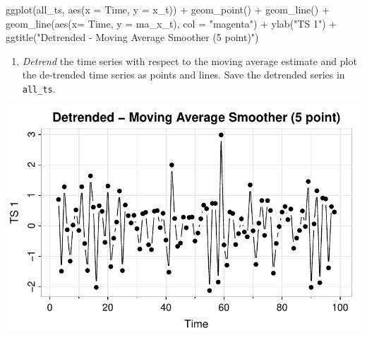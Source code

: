 \documentclass[
  letterpaper,
  DIV=11,
  numbers=noendperiod]{scrartcl}
\newenvironment{Shaded}{\begin{snugshade}}{\end{snugshade}}
\newcommand{\AttributeTok}[1]{\textcolor[rgb]{0.40,0.45,0.13}{#1}}
\newcommand{\DecValTok}[1]{\textcolor[rgb]{0.68,0.00,0.00}{#1}}
\newcommand{\FunctionTok}[1]{\textcolor[rgb]{0.28,0.35,0.67}{#1}}
\newcommand{\NormalTok}[1]{\textcolor[rgb]{0.00,0.23,0.31}{#1}}
\newcommand{\OtherTok}[1]{\textcolor[rgb]{0.00,0.23,0.31}{#1}}
\newcommand{\SpecialCharTok}[1]{\textcolor[rgb]{0.37,0.37,0.37}{#1}}
\newcommand{\StringTok}[1]{\textcolor[rgb]{0.13,0.47,0.30}{#1}}
\providecommand{\tightlist}{%
  \setlength{\itemsep}{0pt}\setlength{\parskip}{0pt}}\usepackage{longtable,booktabs,array}
\begin{document}
\begin{Shaded}
\begin{Highlighting}[]
\FunctionTok{ggplot}\NormalTok{(all\_ts, }\FunctionTok{aes}\NormalTok{(}\AttributeTok{x =}\NormalTok{ Time, }\AttributeTok{y =}\NormalTok{ x\_t)) }\SpecialCharTok{+} \FunctionTok{geom\_point}\NormalTok{() }\SpecialCharTok{+} \FunctionTok{geom\_line}\NormalTok{() }\SpecialCharTok{+} 
  \FunctionTok{geom\_line}\NormalTok{(}\FunctionTok{aes}\NormalTok{(}\AttributeTok{x=}\NormalTok{ Time, }\AttributeTok{y =}\NormalTok{ ma\_x\_t), }\AttributeTok{col =} \StringTok{"magenta"}\NormalTok{) }\SpecialCharTok{+}
  \FunctionTok{ylab}\NormalTok{(}\StringTok{"TS 1"}\NormalTok{) }\SpecialCharTok{+} \FunctionTok{ggtitle}\NormalTok{(}\StringTok{"Detrended {-} Moving Average Smoother (5 point)"}\NormalTok{)}
\end{Highlighting}
\end{Shaded}

\begin{enumerate}
\def\labelenumi{\arabic{enumi}.}
\setcounter{enumi}{3}
\tightlist
\item
  \emph{Detrend} the time series with respect to the moving average
  estimate and plot the de-trended time series as points and lines. Save
  the detrended series in \texttt{all\_ts}.
\end{enumerate}

\begin{Shaded}
\end{Shaded}

\includegraphics{Lecture7_files/figure-pdf/astsa_act2_p4-1.pdf}
\end{document}
